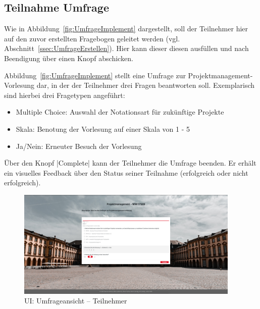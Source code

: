 
\subsection{Teilnahme Umfrage}
\label{ssec:UmfrageImplement}

Wie in Abbildung~\vref{fig:UmfrageImplement} dargestellt, soll der Teilnehmer hier auf den zuvor erstellten Fragebogen geleitet werden (vgl. Abschnitt~\vref{ssec:UmfrageErstellen}).
Hier kann dieser diesen ausfüllen und nach Beendigung über einen Knopf abschicken.

Abbildung~\vref{fig:UmfrageImplement} stellt eine Umfrage zur Projektmanagement-Vorlesung dar, in der der Teilnehmer drei Fragen beantworten soll.
Exemplarisch sind hierbei drei Fragetypen angeführt:
\begin{itemize}
	\item Multiple Choice: Auswahl der Notationsart für zukünftige Projekte
	\item Skala: Benotung der Vorlesung auf einer Skala von 1 - 5
	\item Ja/Nein: Erneuter Besuch der Vorlesung
\end{itemize}

Über den Knopf \jinline|Complete| kann der Teilnehmer die Umfrage beenden.
Er erhält ein visuelles Feedback über den Status seiner Teilnahme (erfolgreich oder nicht erfolgreich).

\begin{figure}[h]
	\centering
	\includegraphics[width=0.95\textwidth, keepaspectratio]{img/client/TeilnahmeUmfrage.png}
	\captionsetup{justification=centering, format=plain}
	\caption[\acl{UI}: Umfrageansicht -- Teilnehmer]{\acl{UI}: Umfrageansicht -- Teilnehmer \\ \quelleScreenshot}
	\label{fig:UmfrageImplement}
\end{figure}
